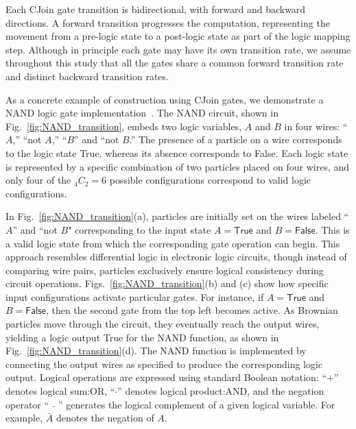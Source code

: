 \documentclass[%
 reprint,
superscriptaddress,
 amsmath,amssymb,
 aps,
 prx,
]{revtex4-2}
\begin{document}
Each CJoin gate transition is bidirectional, with forward and backward directions. A forward transition progresses the computation, representing the movement from a pre-logic state to a post-logic state as part of the logic mapping step. Although in principle each gate may have its own transition rate, we assume throughout this study that all the gates share a common forward transition rate and distinct backward transition rates. 

As a concrete example of construction using CJoin gates, we demonstrate a NAND logic gate implementation~\cite{ercan_fundamental_2018}.
The NAND circuit, shown in Fig.~\ref{fig:NAND_transition}, embeds two logic variables, $A$ and $B$ in four wires: ``$A$,'' ``not $A$,'' ``$B$'' and ``not $B$.''  The presence of a particle on a wire corresponds to the logic state \textsf{True}, whereas its absence corresponds to \textsf{False}. 
Each logic state is represented by a specific combination of two particles placed on four wires, and only four of the $_4C_2=6$ possible configurations correspond to valid logic configurations. 

In Fig.~\ref{fig:NAND_transition}(a), particles are initially set on the wires labeled ``$A$'' and ``not $B$" corresponding to the input state $A=\textsf{True}$ and $B=\textsf{False}$. This is a valid logic state from which the corresponding gate operation can begin. This approach resembles differential logic in electronic logic circuits, though instead of comparing wire pairs, particles exclusively ensure logical consistency during circuit operations. 
Figs.~\ref{fig:NAND_transition}(b) and (c) show how specific input configurations activate particular gates. For instance, if $A=\textsf{True}$ and $B=\textsf{False}$, then the second gate from the top left becomes active. 
As Brownian particles move through the circuit, they eventually reach the output wires, yielding a logic output \textsf{True} for the NAND function, as shown in Fig.~\ref{fig:NAND_transition}(d). The NAND function is implemented by connecting the output wires as specified to produce the corresponding logic output.
Logical operations are expressed using standard Boolean notation:  ``$+$'' denotes logical sum:\textsf{OR}, ``$\cdot$'' denotes logical product:\textsf{AND}, and the negation operator ``$\bar{\quad}$'' generates the logical complement of a given logical variable. For example, $\bar{A}$ denotes the negation of $A$.
\end{document}
